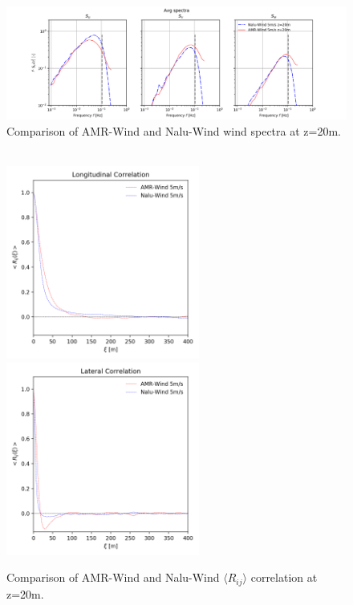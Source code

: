 \begin{figure} %
  \centering
  \includegraphics[width=7.0in]{figures/Compare_AMRWind_NaluWind/AMRWind_NaluWind_Spectra_Stable_z20.png}

  \caption{\label{fig:CompareAMRvsNaluSpectra} Comparison of AMR-Wind
    and Nalu-Wind wind spectra at z=20m. }
\end{figure}

\begin{figure} %
  \centering
  \\
  \includegraphics[width=2.5in]{figures/Compare_AMRWind_NaluWind/AMRWind_NaluWind_Lengthscale_Stable_z20_Longitudinal.png}
  \includegraphics[width=2.5in]{figures/Compare_AMRWind_NaluWind/AMRWind_NaluWind_Lengthscale_Stable_z20_Lateral.png}

  \caption{\label{fig:CompareAMRvsNaluRij}
    Comparison of AMR-Wind and Nalu-Wind $\langle R_{ij}
    \rangle$ correlation at z=20m. }
\end{figure}

